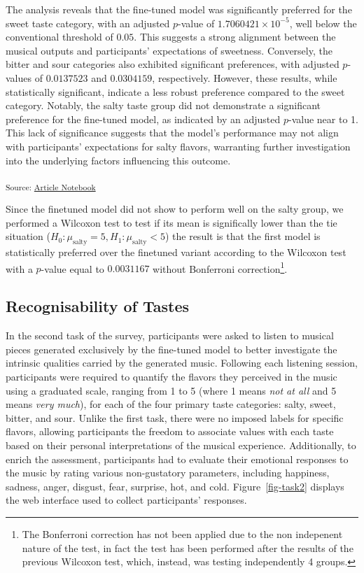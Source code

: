 \documentclass[
  letterpaper,
  DIV=11,
  numbers=noendperiod]{scrartcl}
\begin{document}
The analysis reveals that the fine-tuned model was significantly
preferred for the sweet taste category, with an adjusted \(p\)-value of
\(\ensuremath{1.7060421\times 10^{-5}}\), well below the conventional
threshold of \(0.05\). This suggests a strong alignment between the
musical outputs and participants' expectations of sweetness. Conversely,
the bitter and sour categories also exhibited significant preferences,
with adjusted \(p\)-values of \(0.0137523\) and \(0.0304159\),
respectively. However, these results, while statistically significant,
indicate a less robust preference compared to the sweet category.
Notably, the salty taste group did not demonstrate a significant
preference for the fine-tuned model, as indicated by an adjusted
\(p\)-value near to 1. This lack of significance suggests that the
model's performance may not align with participants' expectations for
salty flavors, warranting further investigation into the underlying
factors influencing this outcome.

\textsubscript{Source:
\href{https://matteospanio.github.io/multimodal-symphony-survey-analysis/index.qmd.html}{Article
Notebook}}

Since the finetuned model did not show to perform well on the salty
group, we performed a Wilcoxon test to test if its mean is significally
lower than the tie situation
(\(H_0: \mu_{\text{salty}} = 5, H_1: \mu_{\text{salty}} < 5\)) the
result is that the first model is statistically preferred over the
finetuned variant according to the Wilcoxon test with a \(p\)-value
equal to \(0.0031167\) without Bonferroni correction\footnote{The
  Bonferroni correction has not been applied due to the non indepenent
  nature of the test, in fact the test has been performed after the
  results of the previous Wilcoxon test, which, instead, was testing
  independently 4 groups.}.

\subsection{Recognisability of Tastes}\label{recognisability-of-tastes}

In the second task of the survey, participants were asked to listen to
musical pieces generated exclusively by the fine-tuned model to better
investigate the intrinsic qualities carried by the generated music.
Following each listening session, participants were required to quantify
the flavors they perceived in the music using a graduated scale, ranging
from 1 to 5 (where 1 means \emph{not at all} and 5 means \emph{very
much}), for each of the four primary taste categories: salty, sweet,
bitter, and sour. Unlike the first task, there were no imposed labels
for specific flavors, allowing participants the freedom to associate
values with each taste based on their personal interpretations of the
musical experience. Additionally, to enrich the assessment, participants
had to evaluate their emotional responses to the music by rating various
non-gustatory parameters, including happiness, sadness, anger, disgust,
fear, surprise, hot, and cold. Figure~\ref{fig-task2} displays the web
interface used to collect participants' responses.
\end{document}
